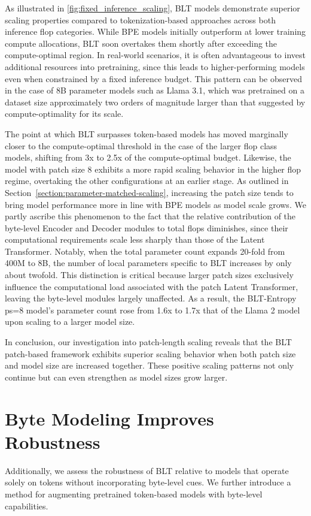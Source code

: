 As illustrated in \autoref{fig:fixed_inference_scaling}, {\textsc BLT} models demonstrate superior scaling properties compared to tokenization-based approaches across both inference flop categories. While BPE models initially outperform at lower training compute allocations, {\textsc BLT} soon overtakes them shortly after exceeding the compute-optimal region. In real-world scenarios, it is often advantageous to invest additional resources into pretraining, since this leads to higher-performing models even when constrained by a fixed inference budget. This pattern can be observed in the case of 8B parameter models such as Llama 3.1, which was pretrained on a dataset size approximately two orders of magnitude larger than that suggested by compute-optimality for its scale.

The point at which {\textsc BLT} surpasses token-based models has moved marginally closer to the compute-optimal threshold in the case of the larger flop class models, shifting from 3x to 2.5x of the compute-optimal budget. Likewise, the model with patch size 8 exhibits a more rapid scaling behavior in the higher flop regime, overtaking the other configurations at an earlier stage. As outlined in Section~\ref{section:parameter-matched-scaling}, increasing the patch size tends to bring model performance more in line with BPE models as model scale grows. We partly ascribe this phenomenon to the fact that the relative contribution of the byte-level Encoder and Decoder modules to total flops diminishes, since their computational requirements scale less sharply than those of the Latent Transformer. Notably, when the total parameter count expands 20-fold from 400M to 8B, the number of local parameters specific to {\textsc BLT} increases by only about twofold. This distinction is critical because larger patch sizes exclusively influence the computational load associated with the patch Latent Transformer, leaving the byte-level modules largely unaffected. As a result, the {\textsc BLT}-Entropy ps=8 model's parameter count rose from 1.6x to 1.7x that of the Llama 2 model upon scaling to a larger model size.

In conclusion, our investigation into patch-length scaling reveals that the {\textsc BLT} patch-based framework exhibits superior scaling behavior when both patch size and model size are increased together. These positive scaling patterns not only continue but can even strengthen as model sizes grow larger.

\section{Byte Modeling Improves Robustness} Additionally, we assess the robustness of {\textsc BLT} relative to models that operate solely on tokens without incorporating byte-level cues. We further introduce a method for augmenting pretrained token-based models with byte-level capabilities.
\label{sec:robustness}

